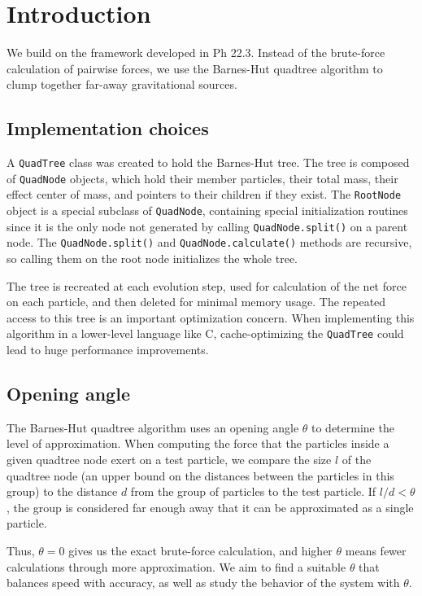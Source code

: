 \documentclass{article}
\begin{document}
\section{Introduction}

We build on the framework developed in Ph 22.3. Instead of the brute-force
calculation of pairwise forces, we use the Barnes-Hut quadtree algorithm
to clump together far-away gravitational sources.

\subsection{Implementation choices}

A \texttt{QuadTree} class was created to hold the Barnes-Hut tree.
The tree is composed of \texttt{QuadNode} objects, which hold their member
particles, their total mass, their effect center of mass, and pointers to
their children if they exist. The \texttt{RootNode} object is a special
subclass of \texttt{QuadNode}, containing special initialization routines
since it is the only node not generated by calling \texttt{QuadNode.split()}
on a parent node. The \texttt{QuadNode.split()} and
\texttt{QuadNode.calculate()} methods are recursive, so calling them on
the root node initializes the whole tree.

The tree is recreated at each evolution step, used for calculation of the
net force on each particle, and then deleted for minimal memory usage.
The repeated access to this tree is an important optimization concern.
When implementing this algorithm in a lower-level language like C,
cache-optimizing the \texttt{QuadTree} could lead to huge performance
improvements.

\subsection{Opening angle}

The Barnes-Hut quadtree algorithm uses an opening angle $\theta$ to
determine the level of approximation. When computing the force that the
particles inside a given quadtree node exert on a test particle, we compare
the size $l$ of the quadtree node (an upper bound on the distances between
the particles in this group) to the distance $d$ from the group of particles
to the test particle. If $l/d < \theta$, the group is considered far enough
away that it can be approximated as a single particle.

Thus, $\theta = 0$ gives us the exact brute-force calculation, and higher
$\theta$ means fewer calculations through more approximation. We aim
to find a suitable $\theta$ that balances speed with accuracy,
as well as study the behavior of the system with $\theta$.
\end{document}
